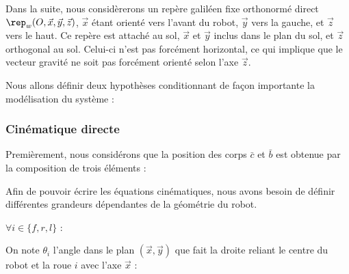 				Dans la suite, nous considèrerons un repère galiléen fixe orthonormé direct $\rep_w(O, \vec{x},\vec{y},\vec{z})$, $\vec{x}$ étant orienté vers l'avant du robot, $\vec{y}$ vers la gauche, et $\vec{z}$ vers le haut. 
				Ce repère est attaché au sol, $\vec{x}$ et $\vec{y}$ inclus dans le plan du sol, et $\vec{z}$ orthogonal au sol. 
				Celui-ci n'est pas forcément horizontal, ce qui implique que le vecteur gravité ne soit pas forcément orienté selon l'axe $\vec{z}$.
					
				Nous allons définir deux hypothèses conditionnant de façon importante la modélisation du système :
			
			\subsubsection{Cinématique directe}
			
					
					Premièrement, nous considérons que la position des corps $\bar{c}$ et $\bar{b}$ est obtenue par la composition de trois éléments :
					
					Afin de pouvoir écrire les équations cinématiques, nous avons besoin de définir différentes grandeurs dépendantes de la géométrie du robot. 

					
					$\forall i\in\{f,r,l\}$ :
					
					On note $\theta_i$ l'angle dans le plan $(\vec{x}, \vec{y})$ que fait la droite reliant le centre du robot et la roue $i$ avec l'axe $\vec{x}$ :
					
